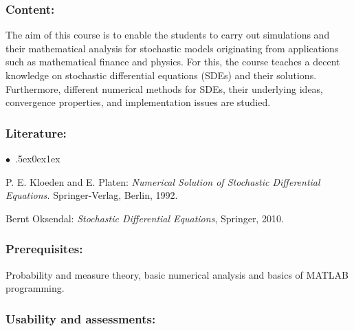 \documentclass[a4paper,10pt]{article}
\renewenvironment{itemize}{\begin{list}{$\bullet$\ }{\itemsep.5ex\setlength{\topsep}{0.5\itemsep}\parsep0ex\labelsep1ex\settowidth{\labelwidth}{$\bullet$\ }\setlength{\leftmargin}{\labelwidth}\addtolength{\leftmargin}{3ex}\addtolength{\leftmargin}{\labelsep}}}{\end{list}}
\begin{document}
\subsubsection*{\large
    Content:
}
The aim of this course is to enable the students to carry out simulations and their mathematical analysis for stochastic models originating from applications such as mathematical finance and physics. For this, the course teaches a decent knowledge on stochastic differential equations (SDEs) and their solutions. Furthermore, different numerical methods for SDEs, their underlying ideas, convergence properties, and implementation issues are studied.
\subsubsection*{\large
    Literature:
}
\begin{itemize}
\item
P. E. Kloeden and E. Platen: \emph{Numerical Solution of Stochastic Differential Equations.} Springer-Verlag, Berlin, 1992. 
\item
Bernt Oksendal: \emph{Stochastic Differential Equations}, Springer, 2010.
\end{itemize}
\subsubsection*{\large
    Prerequisites:
}
Probability and measure theory,  basic numerical analysis and basics of MATLAB programming.
\subsubsection*{\large
    Usability and assessments:
}
\end{document}
